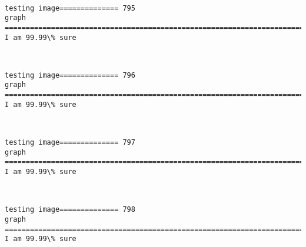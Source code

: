 \documentclass[11pt]{article}
\begin{document}
    \begin{center}
    \end{center}
    { \hspace*{\fill} \\}
    
    \begin{Verbatim}[commandchars=\\\{\}]
testing image============== 795
graph
============================================================================
I am 99.99\% sure

    \end{Verbatim}

    \begin{center}
    \end{center}
    { \hspace*{\fill} \\}
    
    \begin{Verbatim}[commandchars=\\\{\}]
testing image============== 796
graph
============================================================================
I am 99.99\% sure

    \end{Verbatim}

    \begin{center}
    \end{center}
    { \hspace*{\fill} \\}
    
    \begin{Verbatim}[commandchars=\\\{\}]
testing image============== 797
graph
============================================================================
I am 99.99\% sure

    \end{Verbatim}

    \begin{center}
    \end{center}
    { \hspace*{\fill} \\}
    
    \begin{Verbatim}[commandchars=\\\{\}]
testing image============== 798
graph
============================================================================
I am 99.99\% sure

    \end{Verbatim}
\end{document}
